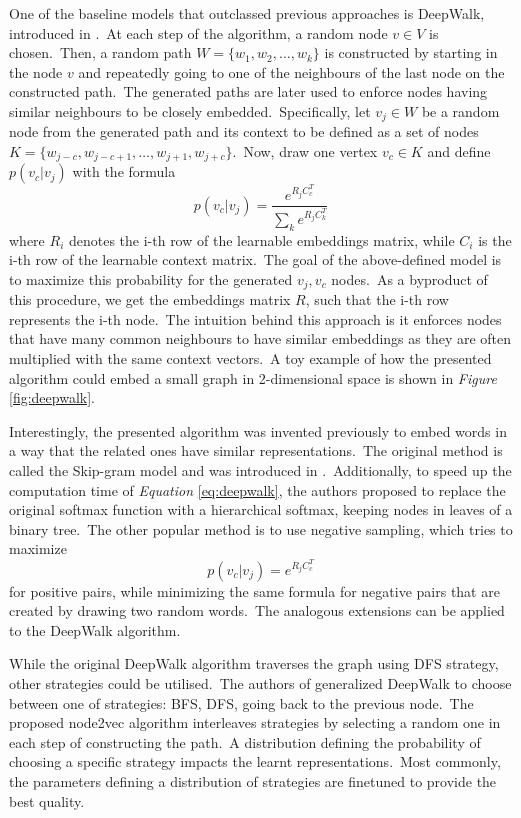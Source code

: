 \documentclass[longabstract, english, mgr]{iithesis}
\theoremstyle{default_theorem_style}\newtheorem{theorem}{Theorem}
\theoremstyle{default_theorem_style}\newtheorem{definition}{Definition}
\begin{document}
One of the baseline models that outclassed previous approaches is DeepWalk, introduced in \cite{deepwalk}.\ At each step
of the algorithm, a random node $v \in V$ is chosen.\ Then, a random path $W = \{w_1, w_2, \dots, w_k\}$ is
constructed by starting in the node $v$ and repeatedly going to one of the neighbours of the last node on the
constructed path.\ The generated paths are later used to enforce nodes having similar neighbours to be closely
embedded.\ Specifically, let $v_j \in W$ be a random node from the generated path and its context to be defined as
a set of nodes $K = \{w_{j - c}, w_{j - c + 1}, \dots, w_{j + 1}, w_{j + c}\}$.\ Now, draw one vertex $v_c \in K$
and define $p(v_c | v_j)$ with the formula
\begin{equation}\label{eq:deepwalk}
p(v_c | v_j) = \frac{e^{R_j C_c^T}}{\sum_k e^{R_j C_k^T}}
\end{equation}
where $R_i$ denotes the i-th row of the learnable embeddings matrix, while $C_i$ is the i-th row of the learnable
context matrix.\ The goal of the above-defined model is to maximize this probability for the generated $v_j, v_c$
nodes.\ As a byproduct of this procedure, we get the embeddings matrix $R$, such that the i-th row represents the
i-th node.\ The intuition behind this approach is it enforces nodes that have many common neighbours to have similar
embeddings as they are often multiplied with the same context vectors.\ A toy example of how the presented algorithm
could embed a small graph in 2-dimensional space is shown in \textit{Figure} \ref{fig:deepwalk}.\newline

\noindent Interestingly, the presented algorithm was invented previously to embed words in a way that the related ones
have similar representations.\ The original method is called the Skip-gram model and was introduced in
\cite{skipgram}.\ Additionally, to speed up the computation time of \textit{Equation} \ref{eq:deepwalk}, the authors
proposed to replace the original softmax function with a hierarchical softmax, keeping nodes in leaves of a binary
tree.\ The other popular method is to use negative sampling, which tries to maximize
$$
p(v_c | v_j) = e^{R_j C_c^T}
$$
for positive pairs, while minimizing the same formula for negative pairs that are created by drawing two random
words.\ The analogous extensions can be applied to the DeepWalk algorithm.\newline

\noindent While the original DeepWalk algorithm traverses the graph using DFS strategy, other strategies could
be utilised.\ The authors of \cite{node2vec} generalized DeepWalk to choose between one of strategies: BFS, DFS,
going back to the previous node.\ The proposed node2vec algorithm interleaves strategies by selecting a random one in
each step of constructing the path.\ A distribution defining the probability of choosing a specific strategy impacts the
learnt representations.\ Most commonly, the parameters defining a distribution of strategies are finetuned to provide
the best quality.\newline
\end{document}
